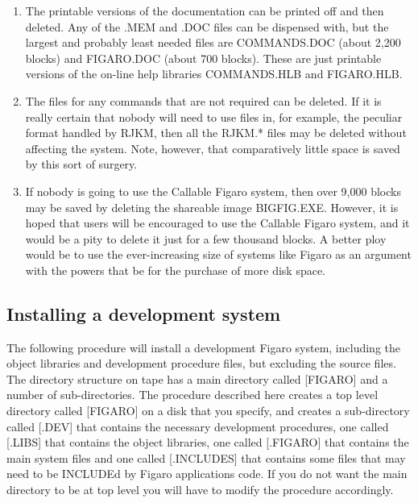 \begin{enumerate}

\item The printable versions of the documentation can be printed off and then
deleted. Any of the .MEM and .DOC files can be dispensed with, but the largest
and probably least needed files are COMMANDS.DOC (about 2,200 blocks) and
FIGARO.DOC (about 700 blocks). These are just printable versions of the on-line
help libraries COMMANDS.HLB and FIGARO.HLB.

\item The files for any commands that are not required can be deleted.  If it
is really certain that nobody will need to use files in, for example, the
peculiar format handled by RJKM, then all the RJKM.* files may  be deleted
without affecting the system.  Note, however, that  comparatively little space
is saved by this sort of surgery.

\item If nobody is going to use the Callable Figaro  system,  then over  9,000
blocks  may  be  saved by deleting the shareable image BIGFIG.EXE.  However, it
is hoped that  users  will  be encouraged to use the Callable Figaro system,
and it would be a pity to delete it just for a few thousand blocks.  A better
ploy would be to use the ever-increasing size of systems like Figaro as an
argument  with  the  powers  that  be  for  the purchase of more disk space.

\end{enumerate}

\subsection{Installing a development system}

The following procedure will install a development Figaro system, including
the  object  libraries and development procedure files, but excluding the
source files.  The directory structure  on  tape  has  a main  directory
called [FIGARO] and a number of sub-directories.  The procedure described here
creates a top level directory called [FIGARO] on  a disk that you specify, and
creates a sub-directory called [.DEV] that contains the necessary development
procedures, one called [.LIBS] that contains the object libraries, one called
[.FIGARO] that contains the main system files and one called [.INCLUDES]  that
contains  some files  that  may  need to be INCLUDEd by Figaro applications
code.  If you do not want the main directory to be at top level you will have
to modify the procedure accordingly.

